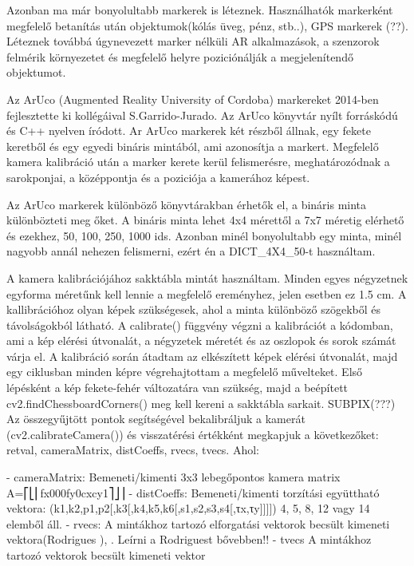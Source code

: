 Azonban ma már bonyolultabb markerek is léteznek. Használhatók markerként megfelelő betanítás után objektumok(kólás üveg, pénz, stb..), GPS markerek (??).
Léteznek továbbá úgynevezett marker nélküli AR alkalmazások, a szenzorok felmérik környezetet és megfelelő helyre poziciónálják a megjelenítendő objektumot. 



Az ArUco (Augmented Reality University of Cordoba) markereket 2014-ben fejlesztette ki kollégáival S.Garrido-Jurado. 
Az ArUco könyvtár nyílt forráskódú és C++ nyelven íródott. 
Ar ArUco markerek két részből állnak, egy fekete keretből és egy egyedi bináris mintából, ami azonosítja a markert.
Megfelelő kamera kalibráció után a marker kerete kerül felismerésre, meghatározódnak a sarokponjai, a középpontja és a poziciója a kamerához képest.

Az ArUco markerek különböző könyvtárakban érhetők el, a bináris minta különbözteti meg őket. A bináris minta lehet 4x4 mérettől a 7x7 méretig elérhető és ezekhez, 50, 100, 250, 1000 ids. Azonban minél bonyolultabb egy minta, minél nagyobb annál nehezen felismerni, ezért én a  DICT_4X4_50-t használtam. 


A kamera kalibrációjához sakktábla mintát használtam. Minden egyes négyzetnek egyforma méretűnk kell lennie a megfelelő ereményhez, jelen esetben ez 1.5 cm. 
A kallibrációhoz olyan képek szükségesek, ahol a minta különböző szögekből és távolságokból látható.
A calibrate() függvény végzni a kalibrációt a kódomban, ami a kép elérési útvonalát, a négyzetek méretét és az oszlopok és sorok számát várja el. A kalibráció során átadtam az elkészített képek elérési útvonalát, majd egy ciklusban minden képre végrehajtottam a megfelelő művelteket.
Első lépésként a kép fekete-fehér változatára van szükség, majd a beépített cv2.findChessboardCorners() meg kell kereni a sakktábla sarkait.
SUBPIX(???)
Az összegyűjtött pontok segítségével bekalibráljuk a kamerát (cv2.calibrateCamera()) és visszatérési értékként megkapjuk a következőket:
retval, cameraMatrix, distCoeffs, rvecs, tvecs. Ahol:

- cameraMatrix: Bemeneti/kimenti 3x3 lebegőpontos kamera matrix A=⎡⎣⎢fx000fy0cxcy1⎤⎦⎥ 
- distCoeffs: Bemeneti/kimenti torzítási együttható vektora: (k1,k2,p1,p2[,k3[,k4,k5,k6[,s1,s2,s3,s4[,τx,τy]]]])  4, 5, 8, 12 vagy 14 elemből áll.
- rvecs: A mintákhoz tartozó elforgatási vektorok becsült kimeneti vektora(Rodrigues ), . Leírni a Rodriguest bővebben!!
- tvecs	 A mintákhoz tartozó vektorok becsült kimeneti vektor


